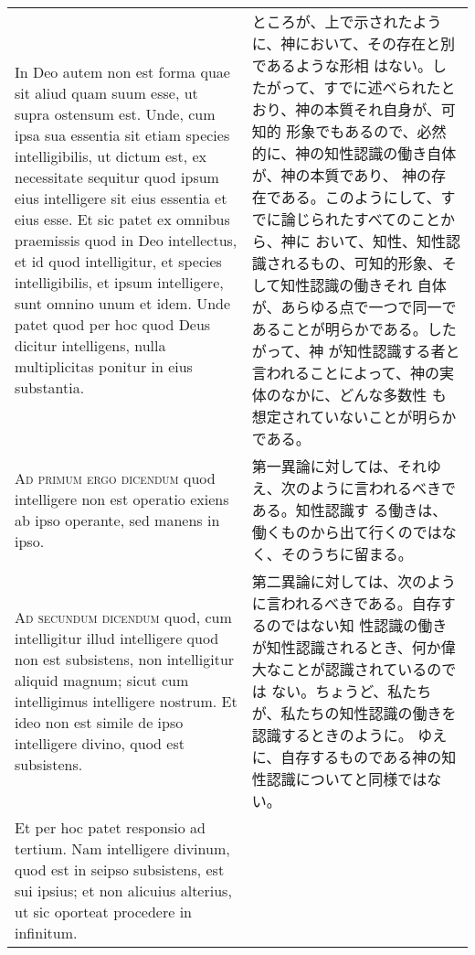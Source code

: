 \documentclass[10pt]{jsarticle} %
\begin{document}
\begin{longtable}{p{21em}p{21em}}
\\

In Deo autem non est forma quae sit aliud quam suum esse, ut supra
ostensum est.  Unde, cum ipsa sua essentia sit etiam species
intelligibilis, ut dictum est, ex necessitate sequitur quod ipsum eius
intelligere sit eius essentia et eius esse. Et sic patet ex omnibus
praemissis quod in Deo intellectus, et id quod intelligitur, et
species intelligibilis, et ipsum intelligere, sunt omnino unum et
idem. Unde patet quod per hoc quod Deus dicitur intelligens, nulla
multiplicitas ponitur in eius substantia.

&

ところが、上で示されたように、神において、その存在と別であるような形相
はない。したがって、すでに述べられたとおり、神の本質それ自身が、可知的
形象でもあるので、必然的に、神の知性認識の働き自体が、神の本質であり、
神の存在である。このようにして、すでに論じられたすべてのことから、神に
おいて、知性、知性認識されるもの、可知的形象、そして知性認識の働きそれ
自体が、あらゆる点で一つで同一であることが明らかである。したがって、神
が知性認識する者と言われることによって、神の実体のなかに、どんな多数性
も想定されていないことが明らかである。

\\


{\scshape Ad primum ergo dicendum} quod intelligere non est operatio
exiens ab ipso operante, sed manens in ipso.

&

第一異論に対しては、それゆえ、次のように言われるべきである。知性認識す
る働きは、働くものから出て行くのではなく、そのうちに留まる。


\\


{\scshape Ad secundum dicendum} quod, cum intelligitur illud
intelligere quod non est subsistens, non intelligitur aliquid magnum;
sicut cum intelligimus intelligere nostrum. Et ideo non est simile de
ipso intelligere divino, quod est subsistens.

&

第二異論に対しては、次のように言われるべきである。自存するのではない知
性認識の働きが知性認識されるとき、何か偉大なことが認識されているのでは
ない。ちょうど、私たちが、私たちの知性認識の働きを認識するときのように。
ゆえに、自存するものである神の知性認識についてと同様ではない。


\\


Et per hoc patet responsio ad tertium. Nam intelligere divinum, quod
est in seipso subsistens, est sui ipsius; et non alicuius alterius, ut
sic oporteat procedere in infinitum.


\end{longtable}
\end{document}
